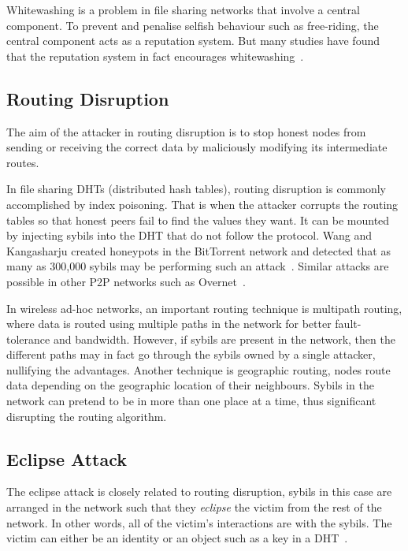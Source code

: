 Whitewashing is a problem in file sharing networks that involve a central
component. To prevent and penalise selfish behaviour such as free-riding, the
central component acts as a reputation system. But many studies have found that
the reputation system in fact encourages whitewashing~\cite{feldman2004free,
  yang2005empirical}.

\subsection{Routing Disruption}\label{sec:routing-disruption}
The aim of the attacker in routing disruption is to stop honest nodes from
sending or receiving the correct data by maliciously modifying its intermediate
routes.

In file sharing DHTs (distributed hash tables), routing disruption is commonly
accomplished by index poisoning. That is when the attacker corrupts the routing
tables so that honest peers fail to find the values they want. It can be mounted
by injecting sybils into the DHT that do not follow the protocol. Wang and
Kangasharju created honeypots in the BitTorrent network and detected that as
many as 300,000 sybils may be performing such an attack~\cite{wang2012real}.
Similar attacks are possible in other P2P networks such as
Overnet~\cite{liang2006index}.

In wireless ad-hoc networks, an important routing technique is multipath
routing, where data is routed using multiple paths in the network for better
fault-tolerance and bandwidth. However, if sybils are present in the network,
then the different paths may in fact go through the sybils owned by a single
attacker, nullifying the advantages. Another technique is geographic routing,
nodes route data depending on the geographic location of their neighbours.
Sybils in the network can pretend to be in more than one place at a time, thus
significant disrupting the routing algorithm\cite{karlof2003secure}.

\subsection{Eclipse Attack}
The eclipse attack is closely related to routing disruption, sybils in this case
are arranged in the network such that they \emph{eclipse} the victim from the
rest of the network. In other words, all of the victim's interactions are with
the sybils. The victim can either be an identity or an object such as a key in a
DHT~\cite{singh2006eclipse}.

